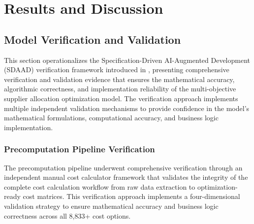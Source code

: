 %
%



\chapter{Results and Discussion}\label{ch:results}
\vspace{-2em}
\setcounter{tocdepth}{2}







\section{Model Verification and Validation}\label{sec:vv}

This section operationalizes the Specification-Driven AI-Augmented Development (SDAAD) verification framework introduced in , presenting comprehensive verification and validation evidence that ensures the mathematical accuracy, algorithmic correctness, and implementation reliability of the multi-objective supplier allocation optimization model. The verification approach implements multiple independent validation mechanisms to provide confidence in the model's mathematical formulations, computational accuracy, and business logic implementation.

\subsection{Precomputation Pipeline Verification}

The precomputation pipeline underwent comprehensive verification through an independent manual cost calculator framework that validates the integrity of the complete cost calculation workflow from raw data extraction to optimization-ready cost matrices. This verification approach implements a four-dimensional validation strategy to ensure mathematical accuracy and business logic correctness across all 8,833+ cost options.

